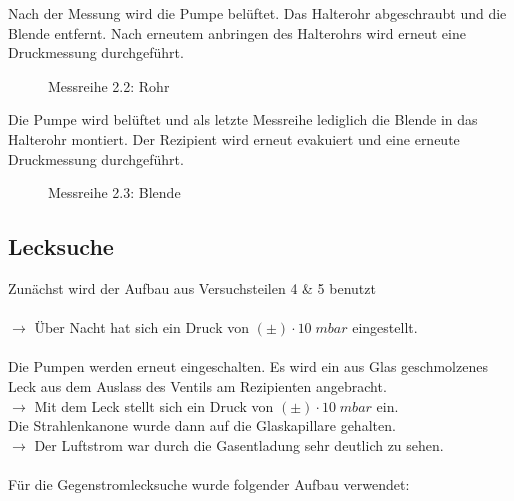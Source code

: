 \documentclass[12pt, a4paper]{scrartcl}
\begin{document}
   		Nach der Messung wird die Pumpe belüftet. Das Halterohr abgeschraubt und die Blende entfernt. Nach erneutem anbringen des Halterohrs wird erneut eine Druckmessung durchgeführt.
   	
   		\begin{figure}[H]
   			\centering
   			\caption{Messreihe 2.2: Rohr}
   		\end{figure}
   	
   		Die Pumpe wird belüftet und als letzte Messreihe lediglich die Blende in das Halterohr montiert. Der Rezipient wird erneut evakuiert und eine erneute Druckmessung durchgeführt.
   	
   		\begin{figure}[H]
   			\centering
   			\caption{Messreihe 2.3: Blende}
   		\end{figure}    
    
    
    \subsection{Lecksuche}
    
		Zunächst wird der Aufbau aus Versuchsteilen 4 \& 5 benutzt\\\\	
		$\rightarrow$ Über Nacht hat sich ein Druck von $(\pm)\cdot 10^{}\ mbar$ eingestellt.\\\\
		Die Pumpen werden erneut eingeschalten. Es wird ein aus Glas geschmolzenes Leck aus dem Auslass des Ventils am Rezipienten angebracht.\\
		$\rightarrow$ Mit dem Leck stellt sich ein Druck von $(\pm)\cdot 10^{}\ mbar$ ein.\\		
		Die Strahlenkanone wurde dann auf die Glaskapillare gehalten.\\
		$\rightarrow$ Der Luftstrom war durch die Gasentladung sehr deutlich zu sehen.\\\\		
		Für die Gegenstromlecksuche wurde folgender Aufbau verwendet:
		
\end{document}
